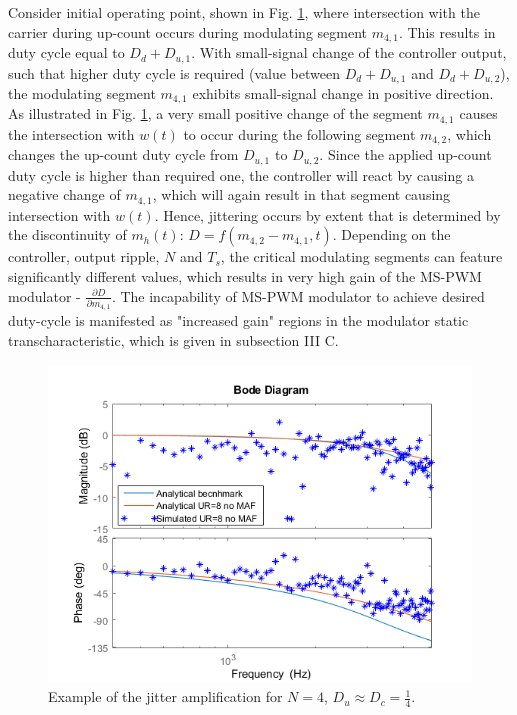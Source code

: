\documentclass[journal]{IEEEtran}
\begin{document}
Consider initial operating point, shown in Fig. \ref{fig:InPhaseJittering}, where intersection with the carrier during up-count occurs during modulating segment $m_{4,1}$. This results in duty cycle equal to $D_d + D_{u,1}$. With small-signal change of the controller output, such that higher duty cycle is required (value between $D_{d}+D_{u,1}$ and $D_{d}+D_{u,2}$), the modulating segment $m_{4,1}$ exhibits small-signal change in positive direction. As illustrated in Fig. \ref{fig:InPhaseJittering}, a very small positive change of the segment $m_{4,1}$ causes the intersection with $w(t)$ to occur during the following segment $m_{4,2}$, which changes the up-count duty cycle from $D_{u,1}$ to $D_{u,2}$. Since the applied up-count duty cycle is higher than required one, the controller will react by causing a negative change of $m_{4,1}$, which will again result in that segment causing intersection with $w(t)$. Hence, jittering occurs by extent that is determined by the discontinuity of $m_h(t)$:  $D = f (m_{4,2} - m_{4,1} , t)$. Depending on the controller, output ripple, $N$ and $T_s$, the critical modulating segments can feature significantly different values, which results in very high gain of the MS-PWM modulator - $\frac{\partial D}{\partial m_{4,1}}$. The incapability of MS-PWM modulator to achieve desired duty-cycle is manifested as "increased gain" regions in the modulator static transcharacteristic, which is given in subsection III C.

\begin{figure}[t!]
    \centerline{\includegraphics[width=0.95\linewidth]{figures/nasb_clfra.png}}
    \caption{Example of the jitter amplification for $N = 4$, $D_u \approx D_c = \frac{1}{4}$.}
    \label{fig:InPhaseJittering}
\end{figure}
\end{document}
